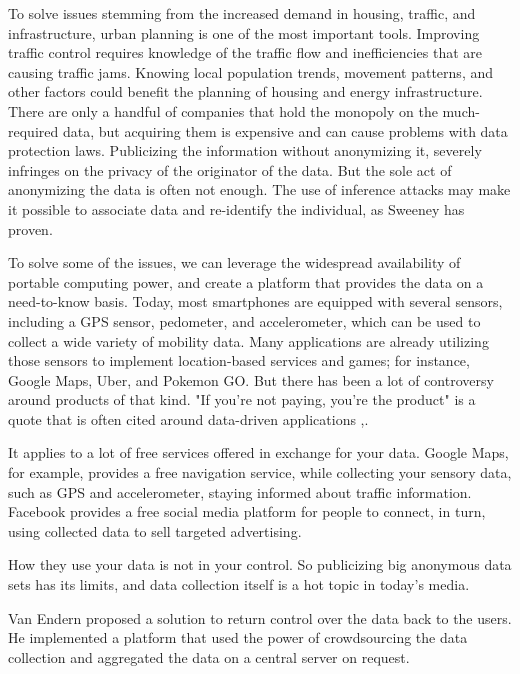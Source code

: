 To solve issues stemming from the increased demand in housing, traffic, and infrastructure, urban planning is one of the most important tools. Improving traffic control requires knowledge of the traffic flow and inefficiencies that are causing traffic jams. Knowing local population trends, movement patterns, and other factors could benefit the planning of housing and energy infrastructure. There are only a handful of companies that hold the monopoly on the much-required data, but acquiring them is expensive and can cause problems with data protection laws. Publicizing the information without anonymizing it, severely infringes on the privacy of the originator of the data. But the sole act of anonymizing the data is often not enough. The use of inference attacks may make it possible to associate data and re-identify the individual, as Sweeney \cite{DBLP:journals/ijufks/Sweene02} has proven.

To solve some of the issues, we can leverage the widespread availability of portable computing power, and create a platform that provides the data on a need-to-know basis. Today, most smartphones are equipped with several sensors, including a GPS sensor, pedometer, and accelerometer, which can be used to collect a wide variety of mobility data. Many applications are already utilizing those sensors to implement location-based services and games; for instance, Google Maps, Uber, and Pokemon GO. But there has been a lot of controversy around products of that kind. "If you're not paying, you're the product" is a quote that is often cited around data-driven applications \cite{newyorktimes}\cite{tedtalk},\cite{arstechnica}.

It applies to a lot of free services offered in exchange for your data. Google Maps, for example, provides a free navigation service, while collecting your sensory data, such as GPS and accelerometer, staying informed about traffic information. Facebook provides a free social media platform for people to connect, in turn, using collected data to sell targeted advertising.

How they use your data is not in your control. So publicizing big anonymous data sets has its limits, and data collection itself is a hot topic in today's media. 

Van Endern \cite{simon} proposed a solution to return control over the data back to the users. He implemented a platform that used the power of crowdsourcing the data collection and aggregated the data on a central server on request.

